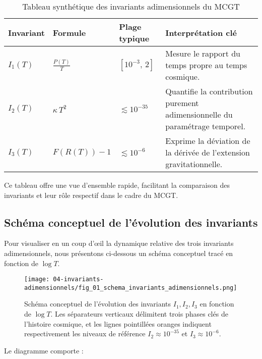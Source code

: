 \begin{table}[htbp]
  \centering
  \caption{Tableau synthétique des invariants adimensionnels du MCGT}
  \label{tab:invariants_synth}
  \begin{tabular}{l l l p{}}
    \toprule
    Invariant & Formule & Plage typique & Interprétation clé \\
    \midrule
    \(I_{1}(T)\) & \(\displaystyle \frac{P(T)}{T}\)
                  & \([10^{-3},\,2]\)
                  & Mesure le rapport du temps propre au temps cosmique. \\
    \(I_{2}(T)\) & \(\displaystyle \kappa\,T^{2}\)
                  & \(\lesssim 10^{-35}\)
                  & Quantifie la contribution purement adimensionnelle du paramétrage temporel. \\
    \(I_{3}(T)\) & \(\displaystyle F(R(T)) - 1\)
                  & \(\lesssim 10^{-6}\)
                  & Exprime la déviation de la dérivée de l’extension gravitationnelle. \\
    \bottomrule
  \end{tabular}
\end{table}

Ce tableau offre une vue d’ensemble rapide, facilitant la comparaison des invariants et leur rôle respectif dans le cadre du MCGT.

\subsection{Schéma conceptuel de l’évolution des invariants}

Pour visualiser en un coup d’œil la dynamique relative des trois invariants adimensionnels, nous présentons ci-dessous un schéma conceptuel tracé en fonction de \(\log T\).

\begin{figure}[htbp]
  \centering
  \texttt{[image: 04-invariants-adimensionnels/fig\_01\_schema\_invariants\_adimensionnels.png]}
  \caption{Schéma conceptuel de l’évolution des invariants \(I_{1},I_{2},I_{3}\) en fonction de \(\log T\).
    Les séparateurs verticaux délimitent trois phases clés de l’histoire cosmique,
    et les lignes pointillées oranges indiquent respectivement les niveaux de référence
    \(I_{2}\approx10^{-35}\) et \(I_{3}\approx10^{-6}\).}
  \label{fig:04_schema_invariants}
\end{figure}

Le diagramme comporte :

